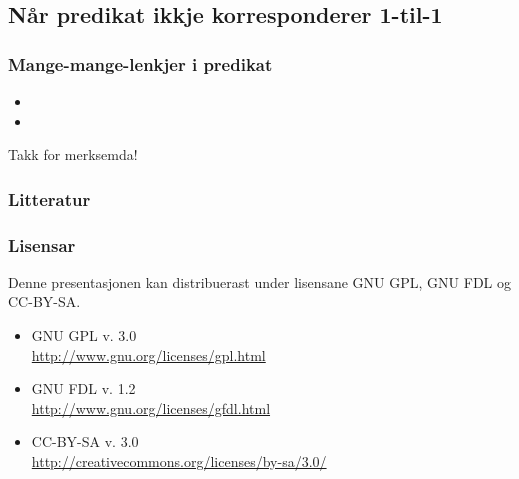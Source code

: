 \documentclass[xcolor=x11names,compress,bigger]{beamer}
\renewcommand{\(}{\begin{columns}}
\renewcommand{\)}{\end{columns}}
\newcommand{\<}[1]{\begin{column}{#1}}
\renewcommand{\>}{\end{column}}
\begin{document}
\subsection{Når predikat ikkje korresponderer 1-til-1}
\begin{frame}\frametitle{Mange-mange-lenkjer i predikat}
  \begin{itemize}
  \item 
  \item 
  \end{itemize}
\end{frame}



\begin{frame}
  \begin{center}
    {\huge Takk for merksemda!}
  \end{center}
\end{frame}

\begin{frame}\frametitle{Litteratur}
  \nocite{dyvik2009lmp}
  
  
\end{frame}

\begin{frame}\frametitle{Lisensar}
  Denne presentasjonen kan distribuerast under lisensane
  GNU GPL, GNU FDL og CC-BY-SA.
  \begin{itemize}
  \item GNU GPL v. 3.0 \\
    \href{http://www.gnu.org/licenses/gpl.html}{http://www.gnu.org/licenses/gpl.html}
  \item GNU FDL v. 1.2 \\
    \href{http://www.gnu.org/licenses/gfdl.html}{http://www.gnu.org/licenses/gfdl.html}
  \item CC-BY-SA v. 3.0 \\
    \href{http://creativecommons.org/licenses/by-sa/3.0/}{http://creativecommons.org/licenses/by-sa/3.0/}
  \end{itemize}
\end{frame}
\end{document}
